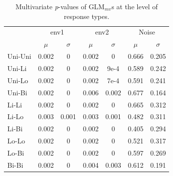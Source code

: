 		\begin{table}[h!] 
				
			\small
			\caption{Multivariate \textit{p}-values of GLM$_{mv}$s at the level of response types.}
			\centering
				
			\begin{tabular}{@{}lcccccc@{}}
					
				\toprule
				& \multicolumn{2}{c}{env1} & \multicolumn{2}{c}{env2} & \multicolumn{2}{c}{Noise}\\\cmidrule(l){2-3} \cmidrule(l){4-5} \cmidrule(l){6-7}
				& $\mu$ & $\sigma$ & $\mu$ & $\sigma$ & $\mu$ & $\sigma$\\
				\hline
				Uni-Uni & 0.002 & 0 & 0.002 & 0 & 0.666 & 0.205 \\
				Uni-Li  & 0.002 & 0 & 0.002 & 9e-4& 0.589 & 0.242 \\
				Uni-Lo  & 0.002 & 0 & 0.002 &  7e-4 & 0.591 & 0.241\\
				Uni-Bi  & 0.002 & 0 & 0.006 & 0.002 & 0.677 & 0.164\\
				Li-Li   & 0.002 & 0 & 0.002 & 0 & 0.665 & 0.312\\
				Li-Lo  & 0.003 &  0.001 & 0.003 & 0.001 & 0.482 & 0.311\\
				Li-Bi  & 0.002 & 0 & 0.002 & 0 & 0.405 &  0.294\\
				Lo-Lo  & 0.002 & 0 & 0.002 & 0 & 0.521 & 0.317\\
				Lo-Bi  & 0.002 & 0 & 0.002 & 0 & 0.597 & 0.269\\
				Bi-Bi  & 0.002 & 0 & 0.004 & 0.003 & 0.612 & 0.191\\
				\toprule
					
			\end{tabular}
			
			\label{tab:SMGLM2}
				
		\end{table}
		
